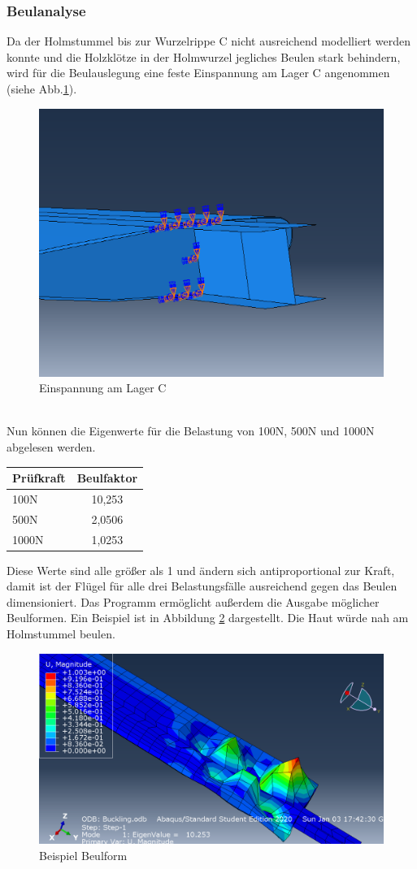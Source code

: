 \subsubsection{Beulanalyse}
Da der Holmstummel bis zur Wurzelrippe C nicht ausreichend modelliert werden konnte und die Holzklötze in der Holmwurzel jegliches Beulen stark behindern, wird für die Beulauslegung eine feste Einspannung am Lager C angenommen (siehe Abb.\ref{BEinspannung}).
\begin{figure}[h]
 \centering
 \includegraphics[scale=0.4]{Bilder/Beuleinspannung}
 \caption{Einspannung am Lager C}
 \label{BEinspannung}
\end{figure}\\
\noindent Nun können die Eigenwerte für die Belastung von 100N, 500N und 1000N abgelesen werden.
\begin{center}
\begin{tabular}[h]{l|c}
Prüfkraft&Beulfaktor\\
\hline
100N&10,253\\
500N&2,0506\\
1000N&1,0253\\
\end{tabular}
\end{center}
\noindent Diese Werte sind alle größer als 1 und ändern sich antiproportional zur Kraft, damit ist der Flügel für alle drei Belastungsfälle ausreichend gegen das Beulen dimensioniert.
Das Programm ermöglicht außerdem die Ausgabe möglicher Beulformen. Ein Beispiel ist in Abbildung \ref{Beulform} dargestellt. Die Haut würde nah am Holmstummel beulen. 
\begin{figure}[h]
 \centering
 \includegraphics[scale=0.4]{Bilder/Beulen100N}
 \caption{Beispiel Beulform}
 \label{Beulform}
\end{figure}
\newpage
\FloatBarrier
\:
\newpage

 

  
